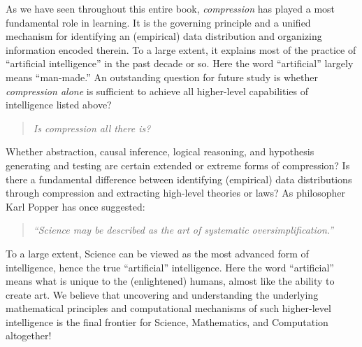 \documentclass[\toplevelprefix/book-main.tex]{subfiles}
\begin{document}
As we have seen throughout this entire book, {\em compression} has played a most fundamental role in learning. It is the governing principle and a unified mechanism for identifying an (empirical) data distribution and organizing information encoded therein. To a large extent, it explains most of the practice of ``artificial intelligence'' in the past decade or so. Here the word ``artificial'' largely means ``man-made.'' An outstanding question for future study is whether {\em compression alone} is sufficient to achieve all higher-level capabilities of intelligence listed above? 
\begin{quote}
\begin{center}
        {\em Is compression all there is?}
\end{center}
\end{quote}
Whether abstraction, causal inference, logical reasoning, and hypothesis generating and testing are certain extended or extreme forms of compression? Is there a fundamental difference between identifying (empirical) data distributions through compression and extracting high-level theories or laws?  As philosopher Karl Popper has once suggested:
\begin{quote}
    \begin{center}
    {\em ``Science may be described as the art of systematic oversimplification.''}
    \end{center}
\end{quote}
To a large extent, Science can be viewed as the most advanced form of intelligence, hence the true ``artificial'' intelligence. Here the word ``artificial'' means what is unique to the (enlightened) humans, almost like the ability to create art. 
We believe that uncovering and understanding the underlying mathematical principles and computational mechanisms of such higher-level intelligence is the final frontier for Science, Mathematics, and Computation altogether!
\end{document}
